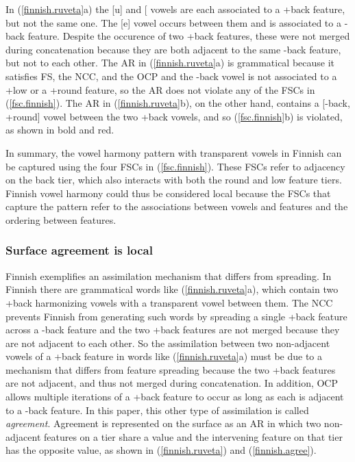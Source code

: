 \documentclass[,doc,floatsintext]{apa6}
\theoremstyle{definition}
\theoremstyle{definition}
\theoremstyle{definition}
\theoremstyle{remark}
\begin{document}
In (\ref{finnish.ruveta}a) the {[}u{]} and {[}\textipa{A}{]} vowels are
each associated to a +back feature, but not the same one. The {[}e{]}
vowel occurs between them and is associated to a -back feature. Despite
the occurence of two +back features, these were not merged during
concatenation because they are both adjacent to the same -back feature,
but not to each other. The AR in (\ref{finnish.ruveta}a) is grammatical
because it satisfies FS, the NCC, and the OCP and the -back vowel is not
associated to a +low or a +round feature, so the AR does not violate any
of the FSCs in (\ref{fsc.finnish}). The AR in (\ref{finnish.ruveta}b),
on the other hand, contains a {[}-back, +round{]} vowel between the two
+back vowels, and so (\ref{fsc.finnish}b) is violated, as shown in bold
and red.

In summary, the vowel harmony pattern with transparent vowels in Finnish
can be captured using the four FSCs in (\ref{fsc.finnish}). These FSCs
refer to adjacency on the back tier, which also interacts with both the
round and low feature tiers. Finnish vowel harmony could thus be
considered local because the FSCs that capture the pattern refer to the
associations between vowels and features and the ordering between
features.

\subsubsection{Surface agreement is
local}\label{surface-agreement-is-local}

Finnish exemplifies an assimilation mechanism that differs from
spreading. In Finnish there are grammatical words like
(\ref{finnish.ruveta}a), which contain two +back harmonizing vowels with
a transparent vowel between them. The NCC prevents Finnish from
generating such words by spreading a single +back feature across a -back
feature and the two +back features are not merged because they are not
adjacent to each other. So the assimilation between two non-adjacent
vowels of a +back feature in words like (\ref{finnish.ruveta}a) must be
due to a mechanism that differs from feature spreading because the two
+back features are not adjacent, and thus not merged during
concatenation. In addition, OCP allows multiple iterations of a +back
feature to occur as long as each is adjacent to a -back feature. In this
paper, this other type of assimilation is called \emph{agreement}.
Agreement is represented on the surface as an AR in which two
non-adjacent features on a tier share a value and the intervening
feature on that tier has the opposite value, as shown in
(\ref{finnish.ruveta}) and (\ref{finnish.agree}).
\end{document}
